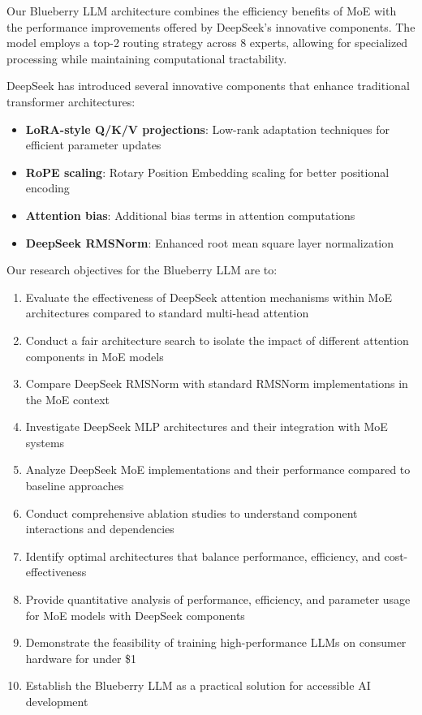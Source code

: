 \documentclass[11pt,a4paper]{article}
\begin{document}
Our Blueberry LLM architecture combines the efficiency benefits of MoE with the performance improvements offered by DeepSeek's innovative components. The model employs a top-2 routing strategy across 8 experts, allowing for specialized processing while maintaining computational tractability.

DeepSeek has introduced several innovative components that enhance traditional transformer architectures:
\begin{itemize}
    \item \textbf{LoRA-style Q/K/V projections}: Low-rank adaptation techniques for efficient parameter updates
    \item \textbf{RoPE scaling}: Rotary Position Embedding scaling for better positional encoding
    \item \textbf{Attention bias}: Additional bias terms in attention computations
    \item \textbf{DeepSeek RMSNorm}: Enhanced root mean square layer normalization
\end{itemize}

Our research objectives for the Blueberry LLM are to:
\begin{enumerate}
    \item Evaluate the effectiveness of DeepSeek attention mechanisms within MoE architectures compared to standard multi-head attention
    \item Conduct a fair architecture search to isolate the impact of different attention components in MoE models
    \item Compare DeepSeek RMSNorm with standard RMSNorm implementations in the MoE context
    \item Investigate DeepSeek MLP architectures and their integration with MoE systems
    \item Analyze DeepSeek MoE implementations and their performance compared to baseline approaches
    \item Conduct comprehensive ablation studies to understand component interactions and dependencies
    \item Identify optimal architectures that balance performance, efficiency, and cost-effectiveness
    \item Provide quantitative analysis of performance, efficiency, and parameter usage for MoE models with DeepSeek components
    \item Demonstrate the feasibility of training high-performance LLMs on consumer hardware for under \$1
    \item Establish the Blueberry LLM as a practical solution for accessible AI development
\end{enumerate}
\end{document}
